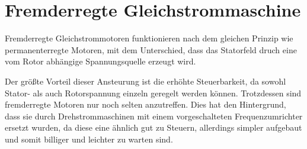 \section{Fremderregte Gleichstrommaschine}
\label{fremd}

Fremderregte Gleichstrommotoren funktionieren nach dem gleichen Prinzip wie permanenterregte Motoren, mit dem Unterschied, dass das Statorfeld druch eine vom Rotor abhängige Spannungsquelle erzeugt wird.

Der größte Vorteil dieser Ansteurung ist die erhöhte Steuerbarkeit, da sowohl Stator- als auch Rotorspannung einzeln geregelt werden können.
Trotzdessen sind fremderregte Motoren nur noch selten anzutreffen.
Dies hat den Hintergrund, dass sie durch Drehstrommaschinen mit einem vorgeschalteten Frequenzumrichter ersetzt wurden, da diese eine ähnlich gut zu Steuern, allerdings simpler aufgebaut und somit billiger und leichter zu warten sind.

\cite{dcdewiki:208635995}